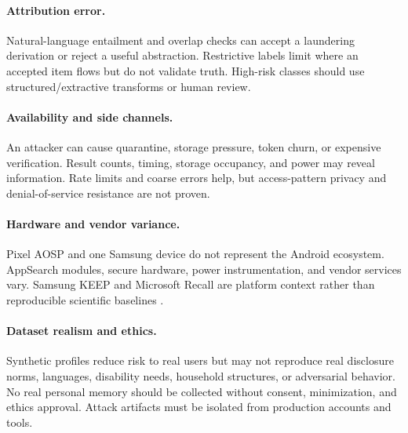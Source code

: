 \paragraph{Attribution error.}
Natural-language entailment and overlap checks can accept a laundering derivation or reject a useful abstraction. Restrictive labels limit where an accepted item flows but do not validate truth. High-risk classes should use structured/extractive transforms or human review.

\paragraph{Availability and side channels.}
An attacker can cause quarantine, storage pressure, token churn, or expensive verification. Result counts, timing, storage occupancy, and power may reveal information. Rate limits and coarse errors help, but access-pattern privacy and denial-of-service resistance are not proven.

\paragraph{Hardware and vendor variance.}
Pixel AOSP and one Samsung device do not represent the Android ecosystem. AppSearch modules, secure hardware, power instrumentation, and vendor services vary. Samsung KEEP and Microsoft Recall are platform context rather than reproducible scientific baselines \citep{samsung2025keep,microsoft2026recall}.

\paragraph{Dataset realism and ethics.}
Synthetic profiles reduce risk to real users but may not reproduce real disclosure norms, languages, disability needs, household structures, or adversarial behavior. No real personal memory should be collected without consent, minimization, and ethics approval. Attack artifacts must be isolated from production accounts and tools.
